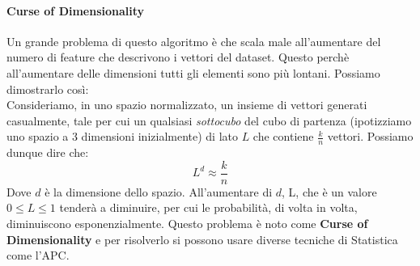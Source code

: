 \paragraph{Curse of Dimensionality}
Un grande problema di questo algoritmo è che scala male all'aumentare del numero di feature che descrivono i vettori
del dataset. Questo perchè all'aumentare delle dimensioni tutti gli elementi sono più lontani.
Possiamo dimostrarlo così:\\
Consideriamo, in uno spazio normalizzato, un insieme di vettori generati casualmente, tale per cui un qualsiasi \textit{sottocubo} del cubo di partenza (ipotizziamo uno spazio a 3 dimensioni inizialmente)
di lato $L$ che contiene $\frac{k}{n}$ vettori. Possiamo dunque dire che:
\begin{equation*}
    L^d \approx \frac{k}{n}
\end{equation*} 
Dove $d$ è la dimensione dello spazio. All'aumentare di $d$, L, che è un valore $0 \leq L \leq 1$ tenderà
a diminuire, per cui le probabilità, di volta in volta, diminuiscono esponenzialmente. Questo problema è
noto come \textbf{Curse of Dimensionality} e per risolverlo si possono usare diverse tecniche di Statistica
come l'APC.